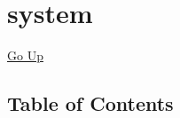 \chapter*{\color{headtoc} system}
\hypertarget{ecldoc:toc:root/system}{}
\hyperlink{ecldoc:toc:}{Go Up}


\section*{Table of Contents}
{\renewcommand{\arraystretch}{1.5}
\begin{longtable}{|p{\textwidth}|}
\hline
\end{longtable}
}

